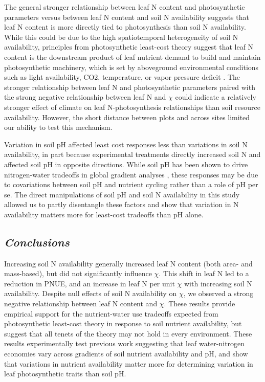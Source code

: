     The general stronger relationship between leaf N content and photosynthetic parameters versus between leaf N content and soil N availability suggests that leaf N content is more directly tied to photosynthesis than soil N availability. While this could be due to the high spatiotemporal heterogeneity of soil N availability, principles from photosynthetic least-cost theory suggest that leaf N content is the downstream product of leaf nutrient demand to build and maintain photosynthetic machinery, which is set by aboveground environmental conditions such as light availability, CO2, temperature, or vapor pressure deficit . The stronger relationship between leaf N and photosynthetic parameters paired with the strong negative relationship between leaf N and $\chi$ could indicate a relatively stronger effect of climate on leaf N-photosynthesis relationships than soil resource availability. However, the short distance between plots and across sites limited our ability to test this mechanism.
    
    Variation in soil pH affected least cost responses less than variations in soil N availability, in part because experimental treatments directly increased soil N and affected soil pH in opposite directions. While soil pH has been shown to drive nitrogen-water tradeoffs in global gradient analyses , these responses may be due to covariations between soil pH and nutrient cycling rather than a role of pH per se. The direct manipulations of soil pH and soil N availability in this study allowed us to partly disentangle these factors and show that variation in N availability matters more for least-cost tradeoffs than pH alone.

    \subsection{\textit{Conclusions}}
    Increasing soil N availability generally increased leaf N content (both area- and mass-based), but did not significantly influence $\chi$. This shift in leaf N led to a reduction in PNUE, and an increase in leaf N per unit $\chi$ with increasing soil N availability. Despite null effects of soil N availability on $\chi$, we observed a strong negative relationship between leaf N content and $\chi$. These results provide empirical support for the nutrient-water use tradeoffs expected from photosynthetic least-cost theory in response to soil nutrient availability, but suggest that all tenets of the theory may not hold in every environment. These results experimentally test previous work suggesting that leaf water-nitrogen economies vary across gradients of soil nutrient availability and pH, and show that variations in nutrient availability matter more for determining variation in leaf photosynthetic traits than soil pH.

